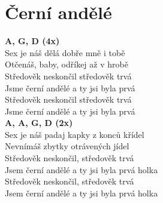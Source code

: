 \section{Černí andělé}
\onehalfspacing

\textbf{A, G, D (4x)}\\
Sex je náš dělá dobře mně i tobě\\
Otčenáš, baby, odříkej až v hrobě\\
Středověk neskončil středověk trvá\\
Jsme černí andělé a ty jsi byla prvá\\ 

Středověk neskončil středověk trvá\\
Jsme černí andělé a ty jsi byla prvá\\ 
\textbf{A, A, G, D (2x)}\\

Sex je náš padaj kapky z konců křídel\\
Nevnímáš zbytky otrávených jídel\\
Středověk neskončil, středověk trvá\\
Jsem černí andělé a ty jsi byla prvá holka\\

Středověk neskončil, středověk trvá\\
Jsem černí andělé a ty jsi byla prvá holka\\

